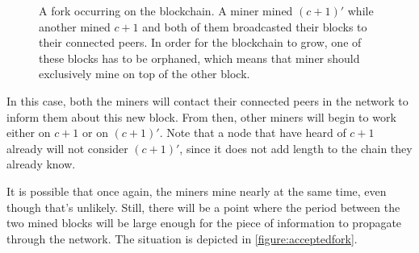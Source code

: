         \begin{figure}[ht]
          \centering
          \caption{A fork occurring on the blockchain. A miner mined \((c+1)'\) while another mined \(c+1\) and both of them broadcasted their blocks to their connected peers. In order for the blockchain to grow, one of these blocks has to be orphaned, which means that miner should exclusively mine on top of the other block.}
          \label{figure:fork}
        \end{figure}
        
        In this case, both the miners will contact their connected peers in the network to inform them about this new block. From then, other miners will begin to work either on \(c+1\) or on \((c+1)'\). Note that a node that have heard of \(c+1\) already will not consider \((c+1)'\), since it does not add length to the chain they already know.
        
        It is possible that once again, the miners mine nearly at the same time, even though that's unlikely. Still, there will be a point where the period between the two mined blocks will be large enough for the piece of information to propagate through the network. The situation is depicted in \autoref{figure:acceptedfork}.
        
